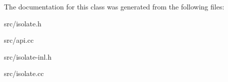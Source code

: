 The documentation for this class was generated from the following files\+:\begin{DoxyCompactItemize}
\item 
src/isolate.\+h\item 
src/api.\+cc\item 
src/isolate-\/inl.\+h\item 
src/isolate.\+cc\end{DoxyCompactItemize}
